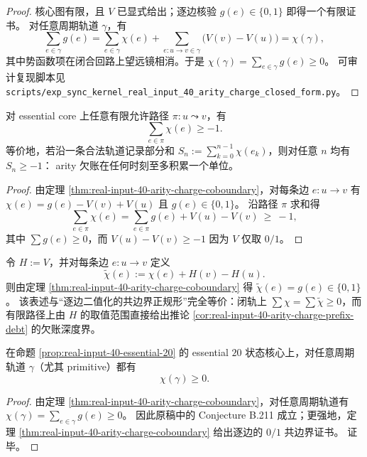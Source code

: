 \begin{proof}
核心图有限，且 $V$ 已显式给出；逐边核验 $g(e)\in\{0,1\}$ 即得一个有限证书。
对任意周期轨道 $\gamma$，有
\[
\sum_{e\in\gamma}g(e)=\sum_{e\in\gamma}\chi(e)+\sum_{e:u\to v\in\gamma}\bigl(V(v)-V(u)\bigr)=\chi(\gamma),
\]
其中势函数项在闭合回路上望远镜相消。于是 $\chi(\gamma)=\sum_{e\in\gamma}g(e)\ge 0$。
可审计复现脚本见
\texttt{scripts/exp\_sync\_kernel\_real\_input\_40\_arity\_charge\_closed\_form.py}。
\end{proof}

\begin{corollary}\label{cor:real-input-40-arity-charge-prefix-debt}
对 essential core 上任意有限允许路径 \(\pi:u\leadsto v\)，有
\[
\sum_{e\in\pi}\chi(e)\ge -1.
\]
等价地，若沿一条合法轨道记录部分和 \(S_n:=\sum_{k=0}^{n-1}\chi(e_k)\)，则对任意 \(n\) 均有 \(S_n\ge -1\)：
arity 欠账在任何时刻至多积累一个单位。
\end{corollary}

\begin{proof}
由定理 \ref{thm:real-input-40-arity-charge-coboundary}，对每条边 \(e:u\to v\) 有
\(
\chi(e)=g(e)-V(v)+V(u)
\)
且 \(g(e)\in\{0,1\}\)。
沿路径 \(\pi\) 求和得
\[
\sum_{e\in\pi}\chi(e)
=\sum_{e\in\pi}g(e)+V(u)-V(v)\ \ge\ -1,
\]
其中 \(\sum g(e)\ge 0\)，而 \(V(u)-V(v)\ge -1\) 因为 \(V\) 仅取 \(0/1\)。
\end{proof}

\begin{remark}\label{rem:real-input-40-arity-charge-chi-tilde}
令 \(H:=V\)，并对每条边 \(e:u\to v\) 定义
\[
\widetilde\chi(e):=\chi(e)+H(v)-H(u).
\]
则由定理 \ref{thm:real-input-40-arity-charge-coboundary} 得 \(\widetilde\chi(e)=g(e)\in\{0,1\}\)。
该表述与“逐边二值化的共边界正规形”完全等价：闭轨上 \(\sum\chi=\sum\widetilde\chi\ge 0\)，而有限路径上由 \(H\) 的取值范围直接给出推论 \ref{cor:real-input-40-arity-charge-prefix-debt} 的欠账深度界。
\end{remark}

\begin{corollary}\label{cor:real-input-40-arity-charge-conjecture-b211}
在命题 \ref{prop:real-input-40-essential-20} 的 essential $20$ 状态核心上，对任意周期轨道 \(\gamma\)（尤其 primitive）都有
\[
\chi(\gamma)\ge 0.
\]
\end{corollary}
\begin{proof}
由定理 \ref{thm:real-input-40-arity-charge-coboundary}，对任意周期轨道有 \(\chi(\gamma)=\sum_{e\in\gamma}g(e)\ge 0\)。
因此原稿中的 Conjecture B.211 成立；更强地，定理 \ref{thm:real-input-40-arity-charge-coboundary} 给出逐边的 \(0/1\) 共边界证书。
证毕。
\end{proof}

